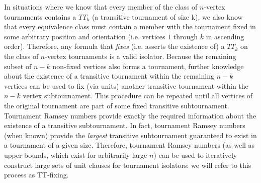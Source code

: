 \documentclass[conference]{IEEEtran}
\newcommand{\zero}{\tikz[baseline=(char.base)]{
            \node[fill=white,shape=circle,inner sep=1pt] (char) {\textcolor{black}{0}};}}
\newcommand{\one}{\tikz[baseline=(char.base)]{
            \node[fill=black,shape=circle,inner sep=1pt] (char) {\textcolor{white}{1}};}}
\begin{document}
In situations where we know that every member of the class of $n$-vertex tournaments contains a $TT_k$ (a transitive tournament of size k), we also know that every equivalence class must contain a member with the tournament fixed in some arbitrary position and orientation (i.e. vertices $1$ through $k$ in ascending order). Therefore, any formula that \emph{fixes} (i.e. asserts the existence of) a $TT_k$ on the class of $n$-vertex tournaments is a valid isolator. Because the remaining subset of $n-k$ non-fixed vertices also forms a tournament, further knowledge about the existence of a transitive tournament within the remaining $n-k$ vertices can be used to fix (via units) another transitive tournament within the $n-k$ vertex subtournament. This procedure can be repeated until all vertices of the original tournament are part of some fixed transitive subtournament. Tournament Ramsey numbers provide exactly the required information about the existence of a transitive subtournament. In fact, tournament Ramsey numbers (when known) provide the \textit{largest} transitive subtournament guaranteed to exist in a tournament of a given size. Therefore, tournament Ramsey numbers (as well as upper bounds, which exist for arbitrarily large $n$) can be used to iteratively construct large sets of unit clauses for tournament isolators: we will refer to this process as TT-fixing.


\end{document}
